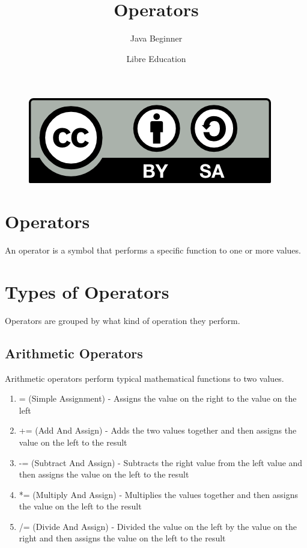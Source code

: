 \documentclass[a4paper]{article}
\title{Operators}
\subtitle{Java Beginner}
\date{}
\author{Libre Education}
\begin{document}
\maketitle


\begin{figure}[b]
\includegraphics{BY-SA}
\centering
\end{figure}

\newpage

\section*{Operators}

An operator is a symbol that performs a specific function to one or more values.

\section*{Types of Operators}
Operators are grouped by what kind of operation they perform.

\subsection*{Arithmetic Operators}
Arithmetic operators perform typical mathematical functions to two values.
\begin{enumerate}

\item = (Simple Assignment) - Assigns the value on the right to the value on the left

\item += (Add And Assign) - Adds the two values together and then assigns the value on the left to the result

\item -= (Subtract And Assign) - Subtracts the right value from the left value and then assigns the value on the left to the result

\item *= (Multiply And Assign) - Multiplies the values together and then assigns the value on the left to the result

\item /= (Divide And Assign) - Divided the value on the left by the value on the right and then assigns the value on the left to the result

\end{enumerate}
\end{document}
